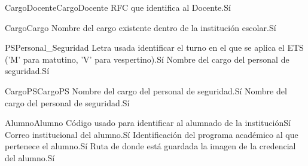\begin{cdtEntidad}{CargoDocente}{CargoDocente}
	{RFC que identifica al Docente.}{Sí}
\end{cdtEntidad}
\begin{cdtEntidad}{Cargo}{Cargo}
	{Nombre del cargo existente dentro de la institución escolar.}{Sí}
\end{cdtEntidad}
\begin{cdtEntidad}{PS}{Personal\_Seguridad}
	{Letra usada identificar el turno en el que se aplica el ETS ('M' para matutino, 'V' para vespertino).}{Sí}
	{Nombre del cargo del personal de seguridad.}{Sí}
	\cdtEntityRelSection
\end{cdtEntidad}
\begin{cdtEntidad}{CargoPS}{CargoPS}
	{Nombre del cargo del personal de seguridad.}{Sí}
	{Nombre del cargo del personal de seguridad.}{Sí}
\end{cdtEntidad}
\begin{cdtEntidad}{Alumno}{Alumno}
	{Código usado para identificar al alumnado de la institución}{Sí}
	{Correo institucional del alumno.}{Sí}
	{Identificación del programa académico al que pertenece el alumno.}{Sí}
	{Ruta de donde está guardada la imagen de la credencial del alumno.}{Sí}
\end{cdtEntidad}
